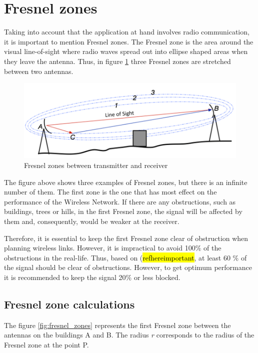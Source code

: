 \section{Fresnel zones}\label{sec:fresnel}
Taking into account that the application at hand involves radio communication, it is important to mention Fresnel zones. The Fresnel zone is the area around the visual line-of-sight where radio waves spread out into ellipse shaped areas when they leave the antenna. Thus, in figure \ref{fig:3fresnel_zones} three Fresnel zones are stretched between two antennas. 

\begin{figure}[H]
	\centering
	\includegraphics[scale=0.65]{figures/fresnel_zones.png}
	\caption{Fresnel zones between transmitter and receiver}
	\label{fig:3fresnel_zones}
\end{figure}

The figure above shows three examples of Fresnel zones, but there is an infinite number of them. The first zone is the one that has most effect on the performance of the Wireless Network. If there are any obstructions, such as buildings, trees or hills, in the first Fresnel zone, the signal will be affected by them and, consequently, would be weaker at the receiver.

Therefore, it is essential to keep the first Fresnel zone clear of obstruction when planning wireless links. However, it is impractical to avoid 100$\%$ of the obstructions in the real-life. Thus, based on (\hl{refhereimportant}, at least 60 $\%$ of the signal should be clear of obstructions. However, to get optimum performance it is recommended to keep the signal 20$\%$ or less blocked.

\subsection{Fresnel zone calculations}
The figure \ref{fig:fresnel_zones} represents the first Fresnel zone between the antennas on the buildings A and B. The radius \textit{r} corresponds to the radius of the Fresnel zone at the point P. 


